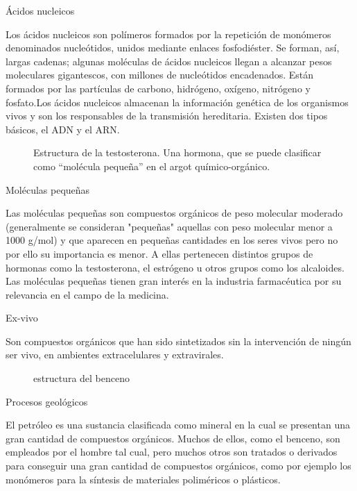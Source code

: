\documentclass[12pt,letterpaper]{article}
\begin{document}
Ácidos nucleicos

Los ácidos nucleicos son polímeros formados por la repetición de monómeros denominados nucleótidos, unidos mediante enlaces fosfodiéster. Se forman, así, largas cadenas; algunas moléculas de ácidos nucleicos llegan a alcanzar pesos moleculares gigantescos, con millones de nucleótidos encadenados. Están formados por las partículas de carbono, hidrógeno, oxígeno, nitrógeno y fosfato.Los ácidos nucleicos almacenan la información genética de los organismos vivos y son los responsables de la transmisión hereditaria. Existen dos tipos básicos, el ADN y el ARN.

\begin{figure}[h]
	\centering
	\caption{Estructura de la testosterona. Una hormona, que se puede clasificar como ``molécula pequeña'' en el argot químico-orgánico.}
\end{figure}

Moléculas pequeñas

Las moléculas pequeñas son compuestos orgánicos de peso molecular moderado (generalmente se consideran "pequeñas" aquellas con peso molecular menor a 1000 g/mol) y que aparecen en pequeñas cantidades en los seres vivos pero no por ello su importancia es menor. A ellas pertenecen distintos grupos de hormonas como la testosterona, el estrógeno u otros grupos como los alcaloides. Las moléculas pequeñas tienen gran interés en la industria farmacéutica por su relevancia en el campo de la medicina.

Ex-vivo

Son compuestos orgánicos que han sido sintetizados sin la intervención de ningún ser vivo, en ambientes extracelulares y extravirales.

\begin{figure}[h]
	\centering
	\caption{estructura del benceno}
\end{figure}



Procesos geológicos

El petróleo es una sustancia clasificada como mineral en la cual se presentan una gran cantidad de compuestos orgánicos. Muchos de ellos, como el benceno, son empleados por el hombre tal cual, pero muchos otros son tratados o derivados para conseguir una gran cantidad de compuestos orgánicos, como por ejemplo los monómeros para la síntesis de materiales poliméricos o plásticos.
\end{document}
